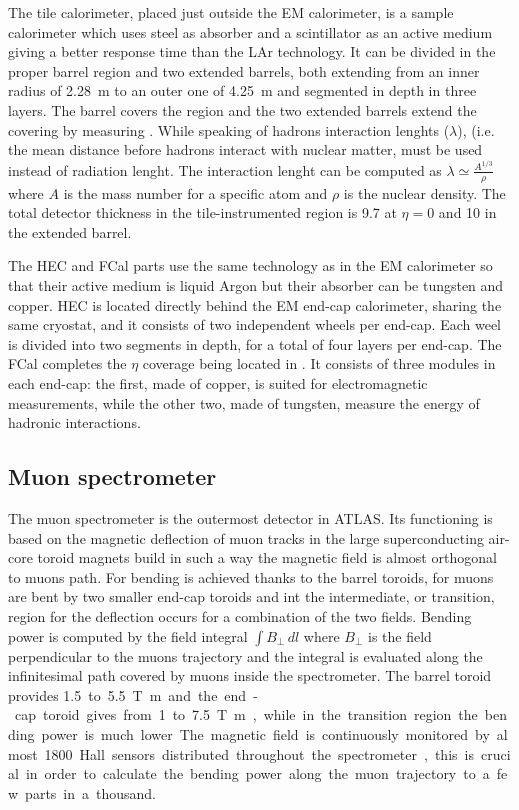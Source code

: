 The tile calorimeter, placed just outside the EM calorimeter, is a sample calorimeter which uses steel as absorber and a scintillator as an active medium giving a better response time than the LAr technology. It can be divided in the proper barrel region and two extended barrels, both extending from an inner radius of \SI{2.28}{m} to an outer one of \SI{4.25}{m} and segmented in depth in three layers. The barrel covers the region  and the two extended barrels extend the covering by measuring . While speaking of hadrons interaction lenghts ($\lambda$), (i.e. the mean distance before hadrons interact with nuclear matter, must be used instead of radiation lenght. The interaction lenght can be computed as $\lambda \simeq \frac{A^{1/3}}{\rho}$ where $A$ is the mass number for a specific atom and $\rho$ is the nuclear density. The total detector thickness in the tile-instrumented region is \SI{9.7}{\lambda} at $\eta = 0$ and \SI{10}{\lambda} in the extended barrel.

The HEC and FCal parts use the same technology as in the EM calorimeter so that their active medium is liquid Argon but their absorber can be tungsten and copper. HEC is located directly behind the EM end-cap calorimeter, sharing the same cryostat, and it consists of two independent wheels per end-cap. Each weel is divided into two segments in depth, for a total of four layers per end-cap. The FCal completes the $\eta$ coverage being located in . It consists of three modules in each end-cap: the first, made of copper, is suited for electromagnetic measurements, while the other two, made of tungsten, measure the energy of hadronic interactions.

\subsection{Muon spectrometer}
\label{sec:muons}
The muon spectrometer is the outermost detector in ATLAS. Its functioning is based on the magnetic deflection of muon tracks in the large superconducting air-core toroid magnets build in such a way the magnetic field is almost orthogonal to muons path. For  bending is achieved thanks to the barrel toroids, for  muons are bent by two smaller end-cap toroids and int the intermediate, or transition, region for  the deflection occurs for a combination of the two fields. Bending power is computed by the field integral $\int B_{\bot}\,dl$ where $B_{\bot}$ is the field perpendicular to the muons trajectory and the integral is evaluated along the infinitesimal path covered by muons inside the spectrometer. The barrel toroid provides \SI{1.5} to \SI{5.5}{T m} and the end-cap toroid gives from \SI{1} to \SI{7.5}{T m}, while in the transition region the bending power is much lower. The magnetic field is continuously monitored by almost 1800 Hall sensors distributed throughout the spectrometer, this is crucial in order to calculate the bending power along the muon trajectory to a few parts in a thousand.

